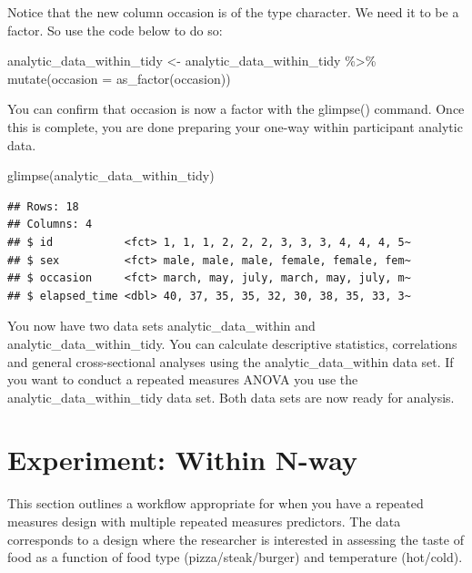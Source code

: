 \documentclass[
]{krantz}
\makeatletter
\newenvironment{Shaded}{\begin{snugshade}}{\end{snugshade}}
\newcommand{\AttributeTok}[1]{\textcolor[rgb]{0.61,0.61,0.61}{#1}}
\newcommand{\FunctionTok}[1]{\textcolor[rgb]{0,0,0}{#1}}
\newcommand{\NormalTok}[1]{#1}
\newcommand{\OtherTok}[1]{\textcolor[rgb]{0.37,0.37,0.37}{#1}}
\newcommand{\SpecialCharTok}[1]{\textcolor[rgb]{0,0,0}{#1}}
\newenvironment{kframe}{%
\medskip{}
\setlength{\fboxsep}{.8em}
 \def\at@end@of@kframe{}%
 \ifinner\ifhmode%
  \def\at@end@of@kframe{\end{minipage}}%
  \begin{minipage}{\columnwidth}%
 \fi\fi%
 \def\FrameCommand##1{\hskip\@totalleftmargin \hskip-\fboxsep
 \colorbox{shadecolor}{##1}\hskip-\fboxsep
     \hskip-\linewidth \hskip-\@totalleftmargin \hskip\columnwidth}%
 \MakeFramed {\advance\hsize-\width
   \@totalleftmargin\z@ \linewidth\hsize
   \@setminipage}}%
 {\par\unskip\endMakeFramed%
 \at@end@of@kframe}
\renewenvironment{Shaded}{\begin{kframe}}{\end{kframe}}
\makeatother
\begin{document}
Notice that the new column occasion is of the type character. We need it to be a factor. So use the code below to do so:

\begin{Shaded}
\begin{Highlighting}[]
\NormalTok{analytic\_data\_within\_tidy }\OtherTok{\textless{}{-}}\NormalTok{ analytic\_data\_within\_tidy }\SpecialCharTok{\%\textgreater{}\%}
  \FunctionTok{mutate}\NormalTok{(}\AttributeTok{occasion =} \FunctionTok{as\_factor}\NormalTok{(occasion))}
\end{Highlighting}
\end{Shaded}

You can confirm that occasion is now a factor with the glimpse() command. Once this is complete, you are done preparing your one-way within participant analytic data.

\begin{Shaded}
\begin{Highlighting}[]
\FunctionTok{glimpse}\NormalTok{(analytic\_data\_within\_tidy)}
\end{Highlighting}
\end{Shaded}

\begin{verbatim}
## Rows: 18
## Columns: 4
## $ id           <fct> 1, 1, 1, 2, 2, 2, 3, 3, 3, 4, 4, 4, 5~
## $ sex          <fct> male, male, male, female, female, fem~
## $ occasion     <fct> march, may, july, march, may, july, m~
## $ elapsed_time <dbl> 40, 37, 35, 35, 32, 30, 38, 35, 33, 3~
\end{verbatim}

You now have two data sets analytic\_data\_within and analytic\_data\_within\_tidy. You can calculate descriptive statistics, correlations and general cross-sectional analyses using the analytic\_data\_within data set. If you want to conduct a repeated measures ANOVA you use the analytic\_data\_within\_tidy data set. Both data sets are now ready for analysis.

\hypertarget{experiment-within-n-way}{%
\section{Experiment: Within N-way}\label{experiment-within-n-way}}

This section outlines a workflow appropriate for when you have a repeated measures design with multiple repeated measures predictors. The data corresponds to a design where the researcher is interested in assessing the taste of food as a function of food type (pizza/steak/burger) and temperature (hot/cold).
\end{document}
